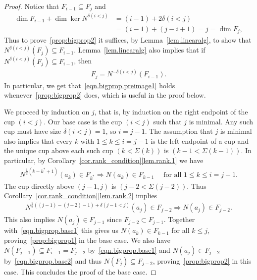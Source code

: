 \documentclass[11pt]{amsart}
\theoremstyle{remark}
\theoremstyle{remark}
\theoremstyle{definition}
\theoremstyle{definition}
\theoremstyle{definition}
\numberwithin{equation}{section}
\renewcommand{\ker}{\operatorname{ker }}
\newcommand{\gd}{\delta}
\newcommand{\E}{\Sigma}
\begin{document}
\begin{proof} Notice that $F_{i-1}\subseteq F_j$ and
\begin{align*}
\dim F_{i-1} + \dim \ker N^{\gd(i<j)} &= (i-1) + 2\gd(i<j)\\
&= (i-1)+(j-i+1) = j = \dim F_j,
\end{align*}
Thus to prove~\eqref{prop:bigprop2} it suffices, by Lemma~\ref{lem.linearalg}, to show that $N^{\gd(i<j)}(F_j) \subseteq F_{i-1}$. Lemma~\ref{lem.linearalg} also implies that if $N^{\gd(i<j)}(F_j) \subseteq F_{i-1}$, then
\begin{eqnarray}\label{eqn.bigprop.preimage1}
F_j = N^{-\gd(i<j)}(F_{i-1}).
\end{eqnarray}
In particular, we get that~\eqref{eqn.bigprop.preimage1} holds whenever~\eqref{prop:bigprop2} does, which is useful in the proof below. 




We proceed by induction on $j$, that is, by induction on the right endpoint of the cup $(i<j)$.  Our base case is the cup $(i<j)$ such that $j$ is minimal.  Any such cup must have size $\gd(i<j) = 1$, so $i=j-1$.  
The assumption that $j$ is minimal also implies that every $k$ with $1\leq k\leq i=j-1$ is the left endpoint of a cup and the unique cup above each such cup $(k<\E(k))$ is $(k-1<\E(k-1))$. In particular, by Corollary~\ref{cor.rank_condition}\eqref{lem.rank.1} we have 
\begin{align}\label{eqn.bigprop.base1}
N^{\frac{1}{2}(k-k^* +1)}(a_k)\in F_{k^*} \Rightarrow N(a_k ) \in F_{k-1} \quad \text{ for all $1\leq k \leq i=j-1$.}
\end{align}
The cup directly above $(j-1, j)$ is $(j-2<\E(j-2))$. Thus Corollary~\ref{cor.rank_condition}\eqref{lem.rank.2} implies
\begin{eqnarray}\label{eqn.bigprop.base2}
N^{\frac{1}{2}((j-1)-(j-2)-1) + \gd(j-1<j)}(a_j) \in F_{j-2} \Rightarrow N(a_j) \in F_{j-2}.
\end{eqnarray}
This also implies $N(a_j)\in F_{j-1}$ since $F_{j-2}\subset F_{j-1}$. Together with~\eqref{eqn.bigprop.base1} this gives us $N(a_k)\in F_{k-1}$ for all $k\leq j$, proving~\eqref{prop:bigprop1} in the base case. We also have $N(F_{j-1})\subseteq F_{i-1}= F_{j-2}$ by~\eqref{eqn.bigprop.base1} and $N(a_j)\in F_{j-2}$ by~\eqref{eqn.bigprop.base2} and thus $N(F_j) \subseteq F_{j-2}$, proving~\eqref{prop:bigprop2} in this case.  This concludes the proof of the base case.








\end{proof}
\end{document}
